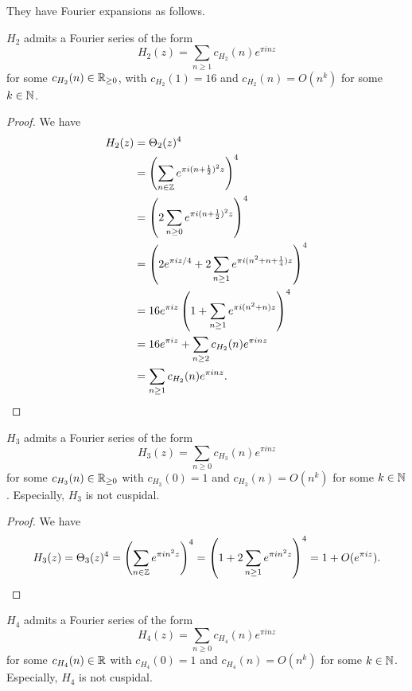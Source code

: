 They have Fourier expansions as follows.
\begin{proposition}\label{prop:H2-fourier}
$H_2$ admits a Fourier series of the form
\begin{equation}
    H_2(z) = \sum_{n \ge 1} c_{H_2}(n) e^{\pi i n z}
\end{equation}
for some $c_{H_2}(n) \in \mathbb{R}_{\ge 0}$, with $c_{H_2}(1) = 16$ and $c_{H_2}(n) = O(n^k)$ for some $k \in \mathbb{N}$.
\end{proposition}
\begin{proof}
We have
\begin{align}
    H_2(z) &= \Theta_2(z)^4 \\
    &= \left(\sum_{n \in \mathbb{Z}} e^{\pi i (n + \frac{1}{2})^{2} z}\right)^{4} \\
    &= \left(2\sum_{n \ge 0} e^{\pi i (n + \frac{1}{2})^{2} z}\right)^{4} \\
    &= \left(2 e^{\pi i z / 4} + 2 \sum_{n \ge 1} e^{\pi i (n^2 + n + \frac{1}{4}) z}\right)^{4} \\
    &= 16 e^{\pi i z}\left(1 + \sum_{n \ge 1} e^{\pi i (n^2 + n)z}\right)^{4} \\
    &= 16 e^{\pi i z} + \sum_{n \ge 2} c_{H_2}(n) e^{\pi i n z} \\
    &= \sum_{n \ge 1} c_{H_2}(n) e^{\pi i n z}.
\end{align}
\end{proof}

\begin{proposition}\label{prop:H3-fourier}
$H_3$ admits a Fourier series of the form
\begin{equation}
    H_3(z) = \sum_{n \ge 0} c_{H_3}(n) e^{\pi i n z}
\end{equation}
for some $c_{H_3}(n) \in \mathbb{R}_{\ge 0}$ with $c_{H_3}(0) = 1$ and $c_{H_3}(n) = O(n^k)$ for some $k \in \mathbb{N}$.
Especially, $H_3$ is not cuspidal.
\end{proposition}
\begin{proof}
We have
\begin{equation}
    H_3(z) = \Theta_3(z)^{4} = \left(\sum_{n \in \mathbb{Z}} e^{\pi i n^2 z}\right)^{4} = \left(1 + 2 \sum_{n \ge 1} e^{\pi i n^2 z}\right)^{4} = 1 + O(e^{\pi i z}).
\end{equation}
\end{proof}

\begin{proposition}\label{prop:H4-fourier}
$H_4$ admits a Fourier series of the form
\begin{equation}
    H_4(z) = \sum_{n \ge 0} c_{H_4}(n) e^{\pi i n z}
\end{equation}
for some $c_{H_4}(n) \in \mathbb{R}$ with $c_{H_4}(0) = 1$ and $c_{H_4}(n) = O(n^k)$ for some $k \in \mathbb{N}$.
Especially, $H_4$ is not cuspidal.
\end{proposition}


